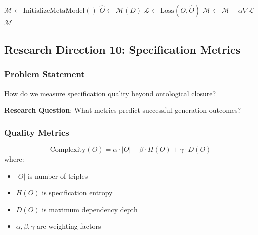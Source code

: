 \begin{algorithm}
\caption{Meta-Learning Specifications}
\begin{algorithmic}[1]
    \State $\mathcal{M} \gets \text{InitializeMetaModel}()$
            \State $\hat{O} \gets \mathcal{M}(D)$ 
            \State $\mathcal{L} \gets \text{Loss}(O, \hat{O})$ 
            \State $\mathcal{M} \gets \mathcal{M} - \alpha \nabla \mathcal{L}$ 
        \EndFor
    \EndFor
    \State \Return $\mathcal{M}$
\EndProcedure
\end{algorithmic}
\end{algorithm}

\subsection{Research Direction 10: Specification Metrics}

\subsubsection{Problem Statement}

How do we measure specification quality beyond ontological closure?

\textbf{Research Question}: What metrics predict successful generation outcomes?

\subsubsection{Quality Metrics}

\begin{definition}
    \begin{equation}
        \text{Complexity}(O) = \alpha \cdot |O| + \beta \cdot H(O) + \gamma \cdot D(O)
    \end{equation}
    where:
    \begin{itemize}
        \item $|O|$ is number of triples
        \item $H(O)$ is specification entropy
        \item $D(O)$ is maximum dependency depth
        \item $\alpha, \beta, \gamma$ are weighting factors
    \end{itemize}
\end{definition}

